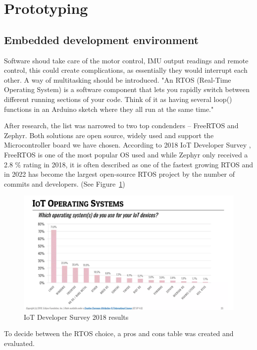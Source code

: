 \documentclass[a4paper,11pt]{article}
\begin{document}
\section{Prototyping}
\subsection{Embedded development environment}

Software shoud take care of the motor control, IMU output readings and remote control, this could create complications, as essentially they would interrupt each other. A way of multitasking should be introduced.
"An RTOS (Real-Time Operating System) is a software component that lets you rapidly switch between different running sections of your code. Think of it as having several loop() functions in an Arduino sketch where they all run at the same time." \cite{Joe2019}

After research, the list was narrowed to two top condenders – FreeRTOS and Zephyr. Both solutions are open source, widely used and support the Microcontroller board we have chosen. \cite{Lemberg}
According to 2018 IoT Developer Survey \cite{IOT}, FreeRTOS is one of the most popular OS used and while Zephyr only received a 2.8 \% rating in 2018, it is often described as one of the fastest growing RTOS and in 2022 has become the largest open-source RTOS project by the number of commits and developers. (See Figure~\ref{fig:iot_os})
\begin{figure}[H]
    \centering
    \includegraphics[scale = 0.5]{iot_os.PNG}
    \caption{IoT Developer Survey 2018 results}
    \label{fig:iot_os}
\end{figure}

To decide between the RTOS choice, a pros and cons table was created and evaluated.
\end{document}
